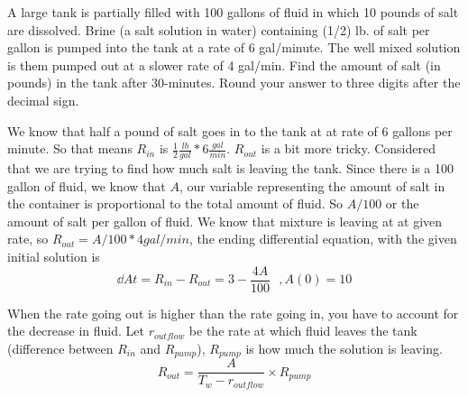 A large tank is partially filled with 100 gallons of fluid in which 10 pounds of salt are dissolved. Brine (a salt solution in water) containing (1/2) lb. of salt per gallon is pumped into the tank at a rate of 6 gal/minute. The well mixed solution is them pumped out at a slower rate of 4 gal/min. Find the amount of salt (in pounds) in the tank after 30-minutes. Round your answer to three digits after the decimal sign.

We know that half a pound of salt goes in to the tank at at rate of 6 gallons per minute. So that means $R_{in}$ is $\frac{1}{2} \frac{lb}{gal} * 6 \frac{gal}{min}$. $R_{out}$ is a bit more tricky. Considered that we are trying to find how much salt is leaving the tank. Since there is a 100 gallon of fluid, we know that $A$, our variable representing the amount of salt in the container is proportional to the total amount of fluid. So $A/100$ or the amount of salt per gallon of fluid. We know that mixture is leaving at at given rate, so $R_{out} = A/100 * 4 gal/min$, the ending differential equation, with the given initial solution is 
\begin{equation*}
	\dd{A}{t} = R_{in} - R_{out} = 3 - \frac{4A}{100} \:\:\:, A(0) = 10 
\end{equation*}

When the rate going out is higher than the rate going in, you have to account for the decrease in fluid. Let $r_{outflow}$ be the rate at which fluid leaves the tank (difference between $R_{in}$ and $R_{pump}$), $R_{pump}$ is how much the solution is leaving.  
\begin{equation*}
	R_{out} = \frac{A}{T_w - r_{outflow}} \times R_{pump}
\end{equation*}
